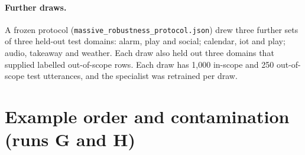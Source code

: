 \documentclass[11pt]{article}
\begin{document}
\paragraph{Further draws.}
A frozen protocol (\texttt{massive\_robustness\_protocol.json}) drew three further sets of three held-out test domains: alarm, play and social; calendar, iot and play; audio, takeaway and weather. Each draw also held out three domains that supplied labelled out-of-scope rows. Each draw has 1,000 in-scope and 250 out-of-scope test utterances, and the specialist was retrained per draw.

\begin{table}[t]
\centering\small
{}
\caption{MASSIVE robustness: weighted turn accuracy and the share of held-out-domain requests rejected (\%) for three further draws of held-out domains and the original confirmatory draw. The specialist was retrained per draw; ``rows'' are labelled out-of-scope rows in Gemma's retrieval pool.}
\label{tab:massive}
\end{table}

\section{Example order and contamination (runs G and H)}
\label{app:gh}
\end{document}
